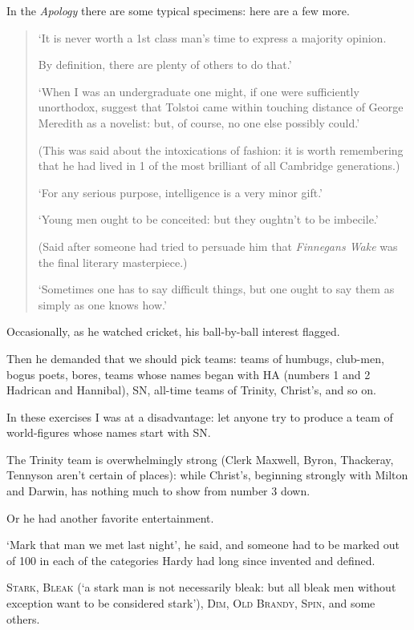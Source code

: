 \documentclass{article}
\numberwithin{equation}{section}
\begin{document}
In the \textit{Apology} there are some typical specimens: here are a few more.
\begin{quotation}
    `It is never worth a 1st class man's time to express a majority opinion.
    
    By definition, there are plenty of others to do that.'
    
    `When I was an undergraduate one might, if one were sufficiently unorthodox, suggest that Tolstoi came within touching distance of George Meredith as a novelist: but, of course, no one else possibly could.'
    
    (This was said about the intoxications of fashion: it is worth remembering that he had lived in 1 of the most brilliant of all Cambridge generations.)
    
    `For any serious purpose, intelligence is a very minor gift.'
    
    `Young men ought to be conceited: but they oughtn't to be imbecile.'
    
    (Said after someone had tried to persuade him that \textit{Finnegans Wake} was the final literary masterpiece.)
    
    `Sometimes one has to say difficult things, but one ought to say them as simply as one knows how.'
\end{quotation}
Occasionally, as he watched cricket, his ball-by-ball interest flagged.

Then he demanded that we should pick teams: teams of humbugs, club-men, bogus poets, bores, teams whose names began with HA (numbers 1 and 2 Hadrican and Hannibal), SN, all-time teams of Trinity, Christ's, and so on.

In these exercises I was at a disadvantage: let anyone try to produce a team of world-figures whose names start with SN.

The Trinity team is overwhelmingly strong (Clerk Maxwell, Byron, Thackeray, Tennyson aren't certain of places): while Christ's, beginning strongly with Milton and Darwin, has nothing much to show from number 3 down.

%
Or he had another favorite entertainment.

`Mark that man we met last night', he said, and someone had to be marked out of 100 in each of the categories Hardy had long since invented and defined.

\textsc{Stark, Bleak} (`a stark man is not necessarily bleak: but all bleak men without exception want to be considered stark'), \textsc{Dim, Old Brandy, Spin}, and some others.
\end{document}
